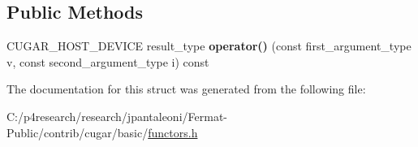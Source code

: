 \subsection*{Public Methods}
\begin{DoxyCompactItemize}
\item 
\mbox{\label{structcugar_1_1component__functor_adb3d77d8c1d9f0ad286103817f41a741}} 
C\+U\+G\+A\+R\+\_\+\+H\+O\+S\+T\+\_\+\+D\+E\+V\+I\+CE result\+\_\+type {\bfseries operator()} (const first\+\_\+argument\+\_\+type v, const second\+\_\+argument\+\_\+type i) const
\end{DoxyCompactItemize}


The documentation for this struct was generated from the following file\+:\begin{DoxyCompactItemize}
\item 
C\+:/p4research/research/jpantaleoni/\+Fermat-\/\+Public/contrib/cugar/basic/\hyperlink{functors_8h}{functors.\+h}\end{DoxyCompactItemize}
